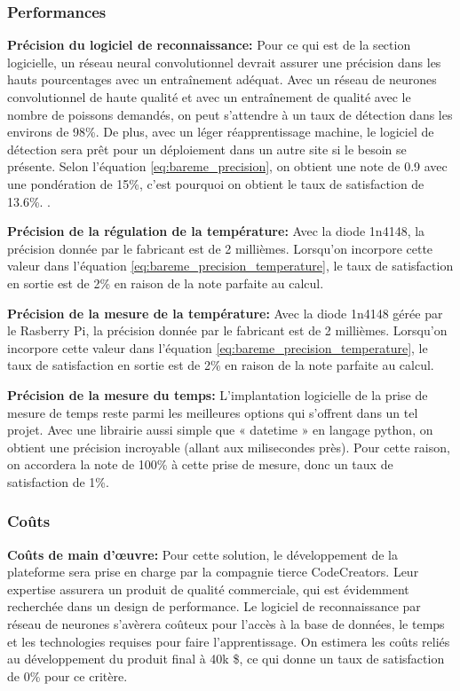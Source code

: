 \subsubsection{Performances}

\textbf{Précision du logiciel de reconnaissance:} Pour ce qui est de la section logicielle, un réseau neural convolutionnel devrait assurer une précision dans les hauts pourcentages avec un entraînement adéquat. Avec un réseau de neurones convolutionnel de haute qualité et avec un entraînement de qualité avec le nombre de poissons demandés, on peut s’attendre à un taux de détection dans les environs de 98\%. De plus, avec un léger réapprentissage machine, le logiciel de détection sera prêt pour un déploiement dans un autre site si le besoin se présente. Selon l’équation \ref{eq:bareme_precision}, on obtient une note de 0.9 avec une pondération de 15\%, c’est pourquoi on obtient le taux de satisfaction de 13.6\%. \cite{neural_yt}.
\vspace{5mm}


\textbf{Précision de la régulation de la température:} Avec la diode 1n4148, la précision donnée par le fabricant est de 2 millièmes. Lorsqu'on incorpore cette valeur dans l'équation \ref{eq:bareme_precision_temperature}, le taux de satisfaction en sortie est de 2\% en raison de la note parfaite au calcul.
\vspace{5mm}

\textbf{Précision de la mesure de la température:} Avec la diode 1n4148 gérée par le Rasberry Pi, la précision donnée par le fabricant est de 2 millièmes. Lorsqu'on incorpore cette valeur dans l'équation \ref{eq:bareme_precision_temperature}, le taux de satisfaction en sortie est de 2\% en raison de la note parfaite au calcul.
\vspace{5mm}

\textbf{Précision de la mesure du temps:}
L’implantation logicielle de la prise de mesure de temps reste parmi les meilleures options qui s’offrent dans un tel projet. Avec une librairie aussi simple que « datetime » en langage python, on obtient une précision incroyable (allant aux milisecondes près). Pour cette raison, on accordera la note de 100\% à cette prise de mesure, donc un taux de satisfaction de 1\%.

\subsubsection{Coûts}

\textbf{Coûts de main d’œuvre:}
Pour cette solution, le développement de la plateforme sera prise en charge par la compagnie tierce CodeCreators. Leur expertise assurera un produit de qualité commerciale, qui est évidemment recherchée dans un design de performance. Le logiciel de reconnaissance par réseau de neurones s'avèrera coûteux pour l'accès à la base de données, le temps  et les technologies requises pour faire l'apprentissage. On estimera les coûts reliés au développement du produit final à 40k \$, ce qui donne un taux de satisfaction de 0\% pour ce critère.
\vspace{5mm}

